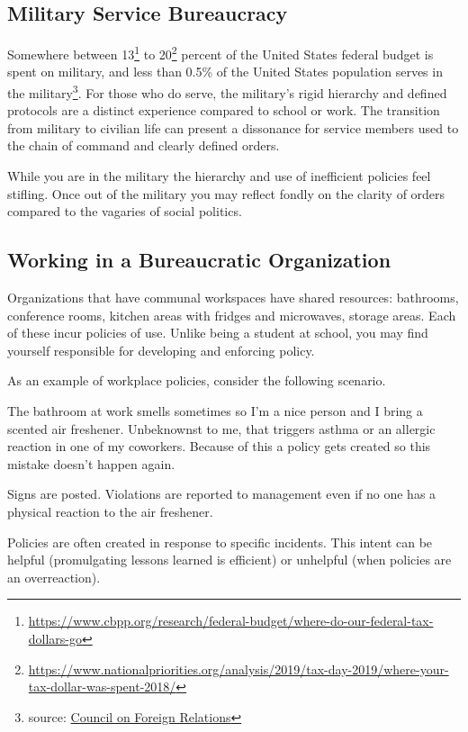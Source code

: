 \subsection*{Military Service Bureaucracy\label{bureaucracy-of-military}}
Somewhere between 13\footnote{\href{https://www.cbpp.org/research/federal-budget/where-do-our-federal-tax-dollars-go}{https://www.cbpp.org/research/federal-budget/where-do-our-federal-tax-dollars-go}} to 20\footnote{\href{https://www.nationalpriorities.org/analysis/2019/tax-day-2019/where-your-tax-dollar-was-spent-2018/}{https://www.nationalpriorities.org/analysis/2019/tax-day-2019/where-your-tax-dollar-was-spent-2018/}} percent of the United States federal budget is spent on military, and 
less than 0.5\% of the United States population serves in the military\footnote{source: \href{https://www.cfr.org/backgrounder/demographics-us-military}{Council on Foreign Relations}}. For those who do serve, the military's rigid hierarchy and defined protocols are a distinct experience compared to school or work. The transition from military to civilian life can present a dissonance for service members used to the chain of command and clearly defined orders. 

While you are in the military the hierarchy and use of inefficient policies feel stifling. Once out of the military you may reflect fondly on the clarity of orders compared to the vagaries of social politics.  

\subsection*{Working in a Bureaucratic Organization\label{sec:bureaucracy-of-work}}



Organizations that have communal workspaces have \glspl{shared resource}: bathrooms, conference rooms, kitchen areas with fridges and microwaves, storage areas. Each of these incur policies of use. Unlike being a student at school, you may find yourself responsible for developing and enforcing policy. 

As an example of workplace policies, consider the following scenario. 
\begin{mdframed}
The bathroom at work smells sometimes so I'm a nice person and I bring a scented air freshener. Unbeknownst to me, that triggers asthma or an allergic reaction in one of my coworkers. Because of this a policy gets created so this mistake doesn't happen again. 

Signs are posted. Violations are reported to management even if no one has a physical reaction to the air freshener.
\end{mdframed}
Policies are often created in response to specific incidents. This intent can be helpful (promulgating lessons learned is efficient) or unhelpful (when policies are an overreaction). 

